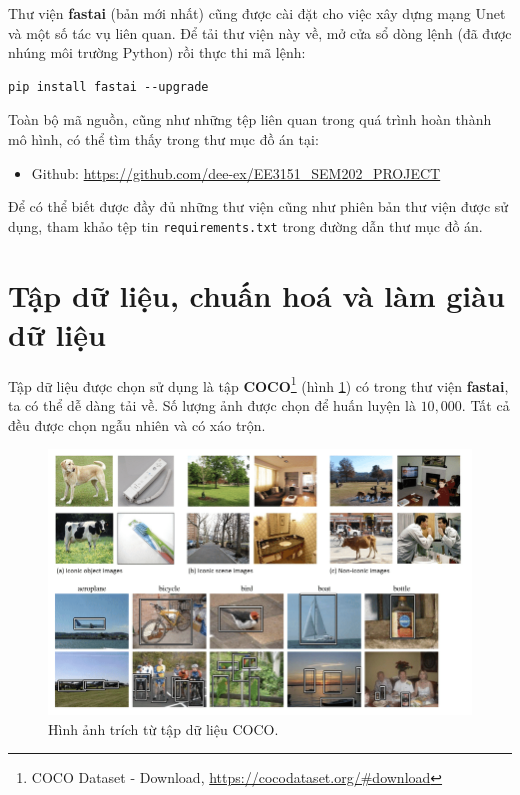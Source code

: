 \documentclass[a4paper, 12pt]{report}
\begin{document}
Thư viện \textbf{fastai} (bản mới nhất) cũng được cài đặt cho việc xây dựng mạng Unet và một số tác vụ liên quan.
Để tải thư viện này về, mở cửa sổ dòng lệnh (đã được nhúng môi trường Python) rồi thực thi mã lệnh:

\begin{lstlisting}
pip install fastai --upgrade
\end{lstlisting}

Toàn bộ mã nguồn, cũng như những tệp liên quan trong quá trình hoàn thành mô hình, có thể tìm thấy trong thư mục đồ án tại:

\begin{itemize}
    \item Github: \href{https://github.com/dee-ex/EE3151\_SEM202\_PROJECT}{https://github.com/dee-ex/EE3151\_SEM202\_PROJECT}
\end{itemize}

Để có thể biết được đầy đủ những thư viện cũng như phiên bản thư viện được sử dụng, tham khảo tệp tin \texttt{requirements.txt} trong đường dẫn thư mục đồ án.

\section{Tập dữ liệu, chuấn hoá và làm giàu dữ liệu}\label{normalization}

Tập dữ liệu được chọn sử dụng là tập \textbf{COCO}\footnote{COCO Dataset - Download, \href{https://cocodataset.org/\#download}{https://cocodataset.org/\#download}} (hình \ref{fig:cocodataset}) có trong thư viện \textbf{fastai}, ta có thể dễ dàng tải về.
Số lượng ảnh được chọn để huấn luyện là $10,000$.
Tất cả đều được chọn ngẫu nhiên và có xáo trộn.

\begin{figure}[!h]
\captionsetup{width=0.8\textwidth}
\centering
\includegraphics[width=15cm]{images/3_1.png}
\caption{Hình ảnh trích từ tập dữ liệu COCO.}
\label{fig:cocodataset}
\end{figure}
\end{document}
